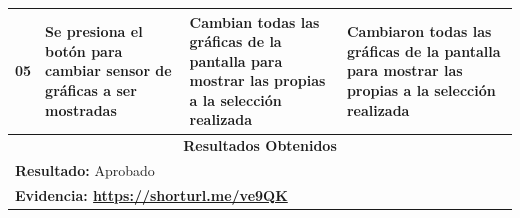 \begin{minipage}{0.95\textwidth}
\begin{center}
\begin{tabularx}{\textwidth}{ | p{2cm} | X | X | X |}
        \hline
        05 & Se presiona el botón para cambiar sensor de gráficas a ser mostradas & Cambian todas las gráficas de la pantalla para mostrar las propias a la selección realizada & Cambiaron todas las gráficas de la pantalla para mostrar las propias a la selección realizada \\
        \hline
        \multicolumn{4}{|c|}{\textbf{Resultados Obtenidos}} \\
        \hline
        \multicolumn{4}{|l|}{\textbf{Resultado:} Aprobado} \\
        \hline
        \multicolumn{4}{|l|}{\textbf{Evidencia: \url{https://shorturl.me/ve9QK} }} \\
        \hline
     \end{tabularx}
    \label{CP007}
    \end{center}
    \end{minipage}
    
    